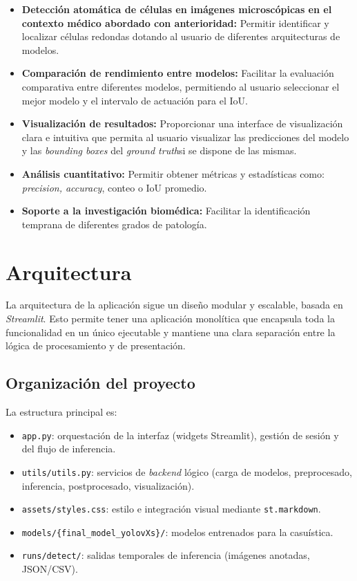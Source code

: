 \documentclass[12pt,a4paper,onecolumn,oneside]{report}
\begin{document}
\begin{itemize}
  \item{\textbf{Detección atomática de células en imágenes microscópicas en el contexto médico abordado con anterioridad:} Permitir identificar
  y localizar células redondas dotando al usuario de diferentes arquitecturas de modelos.}
  \item{\textbf{Comparación de rendimiento entre modelos:} Facilitar la evaluación comparativa entre diferentes modelos,
  permitiendo al usuario seleccionar el mejor modelo y el intervalo de actuación para el IoU.}
  \item{\textbf{Visualización de resultados:} Proporcionar una interface de visualización clara e intuitiva que permita al usuario 
  visualizar las predicciones del modelo y las \textit{bounding boxes} del \textit{ground truth}si se dispone de las mismas.}
  \item{\textbf{Análisis cuantitativo:} Permitir obtener métricas y estadísticas como: \textit{precision, accuracy}, conteo o IoU promedio}.
  \item{\textbf{Soporte a la investigación biomédica:} Facilitar la identificación temprana de diferentes grados de patología.} 
\end{itemize}

\section{Arquitectura}
\label{sec:Arquitectura}
La arquitectura de la aplicación sigue un diseño modular y escalable, basada en \textit{Streamlit}. Esto permite tener una aplicación monolítica que encapsula toda la funcionalidad en un único ejecutable y mantiene 
una clara separación entre la lógica de procesamiento y de presentación.

\subsection{Organización del proyecto}
La estructura principal es:
\begin{itemize}
  \item \texttt{app.py}: orquestación de la interfaz (widgets Streamlit), gestión de sesión y del flujo de inferencia.
  \item \texttt{utils/utils.py}: servicios de \textit{backend} lógico (carga de modelos, preprocesado, inferencia, postprocesado, visualización).
  \item \texttt{assets/styles.css}: estilo e integración visual mediante \texttt{st.markdown}.
  \item \texttt{models/\{final\_model\_yolovXs\}/}: modelos entrenados para la casuística.
  \item \texttt{runs/detect/}: salidas temporales de inferencia (imágenes anotadas, JSON/CSV).
\end{itemize}
\end{document}
